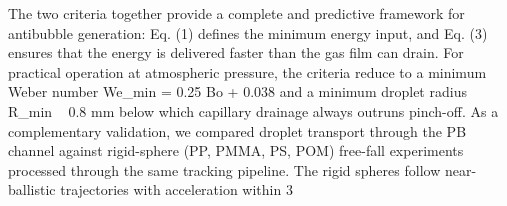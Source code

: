 The two criteria together provide a complete and predictive framework for antibubble generation: Eq. (1) defines the minimum energy input, and Eq. (3) ensures that the energy is delivered faster than the gas film can drain. For practical operation at atmospheric pressure, the criteria reduce to a minimum Weber number We_min = 0.25 Bo + 0.038 and a minimum droplet radius R_min ~ 0.8 mm below which capillary drainage always outruns pinch-off. As a complementary validation, we compared droplet transport through the PB channel against rigid-sphere (PP, PMMA, PS, POM) free-fall experiments processed through the same tracking pipeline. The rigid spheres follow near-ballistic trajectories with acceleration within 3%